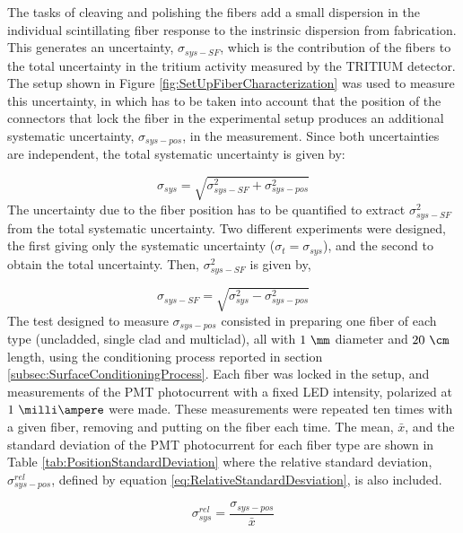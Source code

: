 The tasks of cleaving and polishing the fibers add a small dispersion in the individual scintillating fiber response to the instrinsic dispersion from fabrication. This generates an uncertainty, $\sigma_{sys-SF}$, which is the contribution of the fibers to the total uncertainty in the tritium activity measured by the TRITIUM detector. The setup shown in Figure \ref{fig:SetUpFiberCharacterization} was used to measure this uncertainty, in which has to be taken into account that the position of the connectors that lock the fiber in the experimental setup produces an additional systematic uncertainty, $\sigma_{sys-pos}$, in the measurement. Since both uncertainties are independent, the total systematic uncertainty is given by:

\begin{equation}
\sigma_{sys} = \sqrt{\sigma^2_{sys-SF} + \sigma^2_{sys-pos} }
\label{eq:TotalUncertaintyFiberCharacterization}
\end{equation}
The uncertainty due to the fiber position has to be quantified to extract $\sigma^2_{sys-SF}$ from the total systematic uncertainty. Two different experiments were designed, the first giving only the systematic uncertainty ($\sigma_{t} = \sigma_{sys}$), and the second to obtain the total uncertainty. Then, $\sigma^2_{sys-SF}$ is given by,

\begin{equation}
\sigma_{sys-SF} = \sqrt{\sigma^2_{sys} - \sigma^2_{sys-pos} }
\label{eq:TMUncertaintyFiberCharacterization}
\end{equation}
The test designed to measure $\sigma_{sys-pos}$ consisted in preparing one fiber of each type (uncladded, single clad and multiclad), all with $1~\mm$ diameter and $20~\cm$ length, using the conditioning process reported in section \ref{subsec:SurfaceConditioningProcess}. Each fiber was locked in the setup, and measurements of the PMT photocurrent with a fixed LED intensity, polarized at $1~\milli\ampere$ were made. These measurements were repeated ten times with a given fiber, removing and putting on the fiber each time. The mean, $\bar{x}$, and the standard deviation of the PMT photocurrent for each fiber type are shown in Table \ref{tab:PositionStandardDeviation} where the relative standard deviation, $\sigma^{rel}_{sys-pos}$, defined by equation \ref{eq:RelativeStandardDesviation}, is also included.

\begin{equation}
\sigma^{rel}_{sys} = \frac{\sigma_{sys-pos}}{\bar{x}}
\label{eq:RelativeStandardDesviation}
\end{equation}

